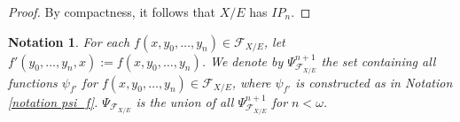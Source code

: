 \documentclass{amsart}
\newtheorem{notation}{Notation}
\newtheorem{external claim}[teor]{Claim}
\newcommand{\C}{{\mathfrak C}}
\newcommand{\mL}{\mathcal{L}}
\DeclareMathOperator{\tp}{{tp}}
\begin{document}
\begin{proof}

    By compactness, it follows that $X/E$ has $IP_n$.
\end{proof}



 \begin{notation}\label{notation PSI}
     For each $f(x,y_0,\dots, y_n)\in \mathcal{F}_{X/E}$, let $f'(y_0,\dots, y_n,x):=f(x,y_0,\dots, y_n)$. We denote by $\Psi^{n+1}_{ \mathcal{F}_{X/E} }$ the set containing all functions $\psi_{f'}$ for $f(x,y_0,\dots, y_n)\in \mathcal{F}_{X/E}$, where $\psi_{f'}$ is constructed as in Notation \ref{notation psi_f}. $\Psi_{ \mathcal{F}_{X/E} }$ is the union of all $\Psi^{n+1}_{ \mathcal{F}_{X/E} }$ for $n<\omega$.
 \end{notation}
\end{document}
